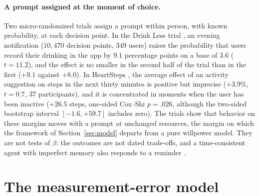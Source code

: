 \documentclass[11pt,a4paper]{article}
\theoremstyle{plain}
\theoremstyle{definition}
\begin{document}
\paragraph{A prompt assigned at the moment of choice.} Two micro-randomized trials assign a prompt within person, with
known probability, at each decision point. In the Drink Less trial \citep{bell2023}, an evening notification
($10{,}470$ decision points, $349$ users) raises the probability that users record their drinking in the app by $9.1$
percentage points on a base of $3.6$ ($t=11.2$), and the effect is no smaller in the second half of the trial than
in the first ($+9.1$ against $+8.0$). In HeartSteps \citep{klasnja2019}, the
average effect of an activity suggestion on steps in the next thirty minutes is positive but imprecise ($+3.9\%$,
$t=0.7$, $37$ participants), and it is concentrated in moments when the user has been inactive ($+26.5$ steps,
one-sided Cox--Shi $p=.026$, although the two-sided bootstrap interval $[-1.6,+59.7]$ includes zero). The trials show
that behavior on these margins moves with a prompt at unchanged resources, the margin on which the framework of
Section~\ref{sec:model} departs from a pure willpower model. They are not tests of $\beta$: the outcomes are not dated
trade-offs, and a time-consistent agent with imperfect memory also responds to a reminder \citep{ericson2017}.

\section{The measurement-error model}
\label{app:me}
\end{document}
